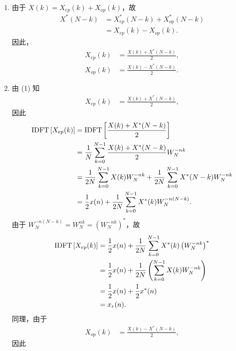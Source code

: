 \begin{solution}
    \begin{enumerate}[label=(\arabic*)]
        \item 由于 $X(k) = X_{ep}(k) + X_{op}(k)$，故
            \begin{align*}
                X^*(N - k) & = X_{ep}^*(N - k) + X_{op}^*(N - k) \\
                & = X_{ep}(k) - X_{op}(k).
            \end{align*}
            因此，
            \begin{align*}
                X_{ep}(k) & = \frac{X(k) + X^*(N - k)}{2}, \\
                X_{op}(k) & = \frac{X(k) - X^*(N - k)}{2}.
            \end{align*}
        \item 由 (1) 知
            \begin{align*}
                X_{ep}(k) & = \frac{X(k) + X^*(N - k)}{2},
            \end{align*}
            因此
            \begin{align*}
                \mathrm{IDFT}\left[X_{ep}(k)\right] & = \mathrm{IDFT}\left[\frac{X(k) + X^*(N - k)}{2}\right] \\
                & = \frac{1}{N}\sum_{k = 0}^{N - 1}\frac{X(k) + X^*(N - k)}{2}W_N^{-nk} \\
                & = \frac{1}{2N}\sum_{k = 0}^{N - 1}X(k)W_N^{-nk} + \frac{1}{2N}\sum_{k = 0}^{N - 1}X^*(N - k)W_N^{-nk} \\
                & = \frac{1}{2}x(n) + \frac{1}{2N}\sum_{k = 0}^{N - 1}X^*(k)W_N^{-n(N - k)}.
            \end{align*}
            由于 $W_N^{-n(N - k)} = W_N^{nk} = \left(W_N^{-nk}\right)^*$，故
            \begin{align*}
                \mathrm{IDFT}\left[X_{ep}(k)\right] & = \frac{1}{2}x(n) + \frac{1}{2N}\sum_{k = 0}^{N - 1}X^*(k)\left(W_N^{-nk}\right)^* \\
                & = \frac{1}{2}x(n) + \frac{1}{2N}\left(\sum_{k = 0}^{N - 1}X(k)W_N^{-nk}\right) \\
                & = \frac{1}{2}x(n) + \frac{1}{2}x^*(n) \\
                & = x_r(n).
            \end{align*}
            同理，由于
            \begin{align*}
                X_{op}(k) & = \frac{X(k) - X^*(N - k)}{2},
            \end{align*}
            因此

\end{enumerate}
\end{solution}
